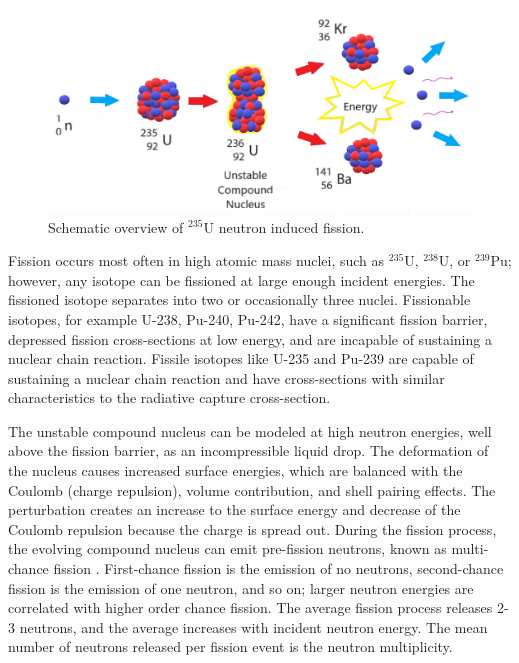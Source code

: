 \begin{figure}[ht]
	\includegraphics[width=\linewidth]{Figures/Chapter2/Fission.png}
	\caption{Schematic overview of $^{235}$U neutron induced fission. }
	\label{fig:fission}	
\end{figure}

Fission occurs most often in high atomic mass nuclei, such as $^{235}$U, $^{238}$U, or $^{239}$Pu; however, any isotope can be fissioned at large enough incident energies. 
The fissioned isotope separates into two or occasionally three nuclei\cite{Bridgman}. 
Fissionable isotopes, for example U-238, Pu-240, Pu-242, have a significant fission barrier, depressed fission cross-sections at low energy, and are incapable of sustaining a nuclear chain reaction. 
Fissile isotopes like U-235 and Pu-239 are capable of sustaining a nuclear chain reaction and have cross-sections with similar characteristics to the radiative capture cross-section. 

The unstable compound nucleus can be modeled at high neutron energies, well above the fission barrier, as an incompressible liquid drop\cite{Krane,Tonchev0}. 
The deformation of the nucleus causes increased surface energies, which are balanced with the Coulomb (charge repulsion), volume contribution, and shell pairing effects. 
The perturbation creates an increase to the surface energy and decrease of the Coulomb repulsion because the charge is spread out\cite{Randrup2012}. 
During the fission process, the evolving compound nucleus can emit pre-fission neutrons, known as multi-chance fission \cite{Randrup2012}. 
First-chance fission is the emission of no neutrons, second-chance fission is the emission of one neutron, and so on; %
larger neutron energies are correlated with higher order chance fission. 
The average fission process releases 2-3 neutrons, and the average increases with incident neutron energy. 
The mean number of neutrons released per fission event is the neutron multiplicity.  

